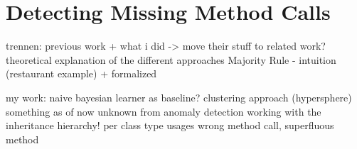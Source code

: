\chapter{Detecting Missing Method Calls}

 trennen: previous work + what i did -> move their stuff to related work?
	theoretical explanation of the different approaches
	Majority Rule - intuition (restaurant example) + formalized 

my work:
	naive bayesian learner as baseline?
	clustering approach (hypersphere)
	something as of now unknown from anomaly detection
    working with the inheritance hierarchy!
    per class type usages
    wrong method call, superfluous method
